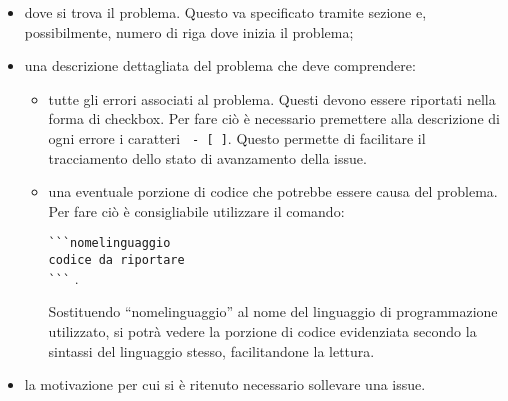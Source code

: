 \documentclass[../NormeProgetto.tex]{subfiles}
\begin{document}
		\begin{itemize} 
			\item dove si trova il problema. Questo va specificato tramite sezione e, possibilmente, numero di riga dove inizia il problema;
			\item una descrizione dettagliata del problema che deve comprendere:
			\begin{itemize}
				\item tutte gli errori associati al problema. Questi devono essere riportati nella forma di checkbox. Per fare ciò è necessario premettere alla descrizione di ogni errore i caratteri \texttt{ - [ ]}. Questo permette di facilitare il tracciamento dello stato di avanzamento della issue\g.
				\item una eventuale porzione di codice che potrebbe essere causa del problema. Per fare ciò è consigliabile utilizzare il comando: \begin{center} \texttt {\`{}\`{}\`{}nomelinguaggio\\ codice da riportare\\ \`{}\`{}\`{}} .\end{center} Sostituendo ``nomelinguaggio'' al nome del linguaggio di programmazione utilizzato, si potrà vedere la porzione di codice evidenziata secondo la sintassi del linguaggio stesso, facilitandone la lettura.
			\end{itemize}
			\item la motivazione per cui si è ritenuto necessario sollevare una issue\g.
		\end{itemize}
		
\end{document}
